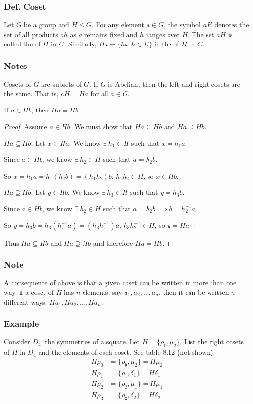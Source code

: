 \subsubsection{Def. Coset}
Let $G$ be a group and $H \leq G$. For any element $a \in G$, the symbol $aH$ denotes the set of all products $ah$ as $a$ remains fixed and $h$ ranges over $H$. The set $aH$ is called the  of $H$ in $G$. Similarly, $Ha = \{ha : h \in H\}$ is the  of $H$ in $G$.

\subsubsection*{Notes}
Cosets of $G$ are subsets of $G$. If $G$ is Abelian, then the left and right cosets are the same. That is, $aH = Ha$ for all $a \in G$.

If $a \in Hb$, then $Ha = Hb$.
\begin{proof}
    Assume $a \in Hb$. We must show that $Ha \subseteq Hb$ and $Ha \supseteq Hb$.
    \begin{proof}[$Ha \subseteq Hb$]
        Let $x \in Ha$. We know $\exists~h_1 \in H$ such that $x = h_1a$.

        Since $a \in Hb$, we know $\exists~h_2 \in H$ such that $a = h_2b$.

        So $x = h_1a = h_1(h_2b) = (h_1h_2)b$. $h_1h_2 \in H$, so $x \in Hb$.
    \end{proof}
    \begin{proof}[$Ha \supseteq Hb$]
        Let $y \in Hb$. We know $\exists~h_3 \in H$ such that $y = h_3b$.

        Since $a \in Hb$, we know $\exists~h_2 \in H$ such that $a = h_2b \implies b = h_2^{-1}a$.

        So $y = h_3b = h_3(h_2^{-1}a) = (h_3h_2^{-1})a$. $h_3h_2^{-1} \in H$, so $y = Ha$.
    \end{proof}
    Thus $Ha \subseteq Hb$ and $Ha \supseteq Hb$ and therefore $Ha = Hb$.
\end{proof}

\subsubsection*{Note}
A consequence of above is that a given coset can be written in more than one way. if a coset of $H$ has $n$ elements, say $a_1,a_2,\ldots,a_n$, then it can be written $n$ different ways: $Ha_1,Ha_2,\ldots,Ha_n$.

\subsubsection*{Example}
Consider $D_4$, the symmetries of a square. Let $H = \{\rho_0,\mu_2\}$. List the right cosets of $H$ in $D_4$ and the elements of each coset. See table 8.12 (not shown).
\begin{align*}
    H\rho_0 & = \{\rho_0, \mu_2\} = H\mu_2 \\
    H\rho_1 & = \{\rho_1, \delta_1\} = H\delta_1 \\
    H\rho_2 & = \{\rho_2, \mu_1\} = H\mu_1 \\
    H\rho_3 & = \{\rho_3, \delta_2\} = H\delta_2
\end{align*}

